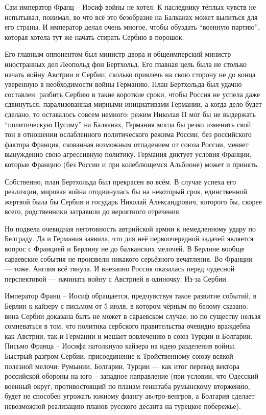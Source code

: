 Сам император Франц -- Иосиф войны не хотел. К наследнику тёплых чувств не
испытывал, понимал, во что всё это безобразие на Балканах может вылиться для его
страны. И император делал очень многое, чтобы обуздать \enquote{военную партию},
которая хотела тут же начать стирать Сербию в порошок.

Его главным оппонентом был министр двора и общеимперский министр иностранных дел
Леопольд фон Бертхольд. Его главная цель была не столько начать войну Австрии и
Сербии, сколько привлечь на свою сторону не до конца уверенную в необходимости
войны Германию. План Бертхольда был удачно составлен: разбить Сербию в такие
короткие сроки, чтобы Россия не успела даже сдвинуться, парализованная мирными
инициативами Германии, а когда дело будет сделано, то оставалось совсем немного:
режим Николая II мог бы не выдержать \enquote{политическую Цусиму} на Балканах,
Германия могла бы резко изменить свой тон в отношении ослабленного политического
режима России, без российского фактора Франция, скованная возможным отпадением
от союза России, меняет вынужденно свою агрессивную политику. Германия диктует
условия Франции, которые Францию (без России и при колеблющемся Альбионе) может
и принять.

Собственно, план Бертхольда был прекрасен во всём. В случае успеха его
реализции, мировая война отодвинулась бы на некоторый срок, единственной жертвой
была бы Сербия и государь Николай Александрович, которого бы, скорее всего,
родственники затравили до вероятного отречения.

Но подвела очевидная неготовность автрийской армии к немедленному удару по
Белграду. Да и Германия заявила, что для неё первоочередной задачей является
вопрос с Францией и Берлину не до балканских мелочей. В Берлине вообще
сараевские события не произвели никакого серьёзного вечатления. Во Франции ---
тоже. Англия всё тянула. И внезапно Россия оказалась перед чудесной перспективой
--- начинать войну с Австрией в одиночку. Из-за Сербии.

Император Франц -- Иосиф обращается, предчувствуя такое развитие событий, в Берлин
к кайзеру с письмом от 5 июля, в котором чёрным по белому сказано: вина Сербии
доказана быть не может в сараевском случае, но по существу нельзя сомневаться
в том, что политика сербского правительства очевидно враждебна как Австрии, так
и Германии и мешает вовлечению в союз Турции и Болгарии. Письмо Франца -- Иосифа
натолкнуло кайзера на идею разделения войны. Быстрый разгром Сербии,
присоединение к Тройственному союзу всякой полезной мелочи: Румынии, Болгарии,
Турции --- как итог перевод вектора российской обороны на юго -- западное
направление (при условии, что Одесский военный округ, противостоящий по планам
генштаба румынскому вторжению, будет не способен угрожать южному флангу
авcтро-венгров, а Болгария сделает невозможной реализацию планов русского
десанта на турецкое побережье).

